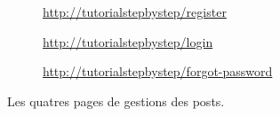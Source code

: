 \begin{figure}[!h]
    \begin{subfigure}[c]{0.73\textwidth}
    \end{subfigure}\hfill
    \begin{subfigure}[c]{0.24\textwidth}
        \caption{\url{http://tutorialstepbystep/register}} 
    \end{subfigure}
    \begin{subfigure}[c]{0.73\textwidth}
    \end{subfigure}\hfill
    \begin{subfigure}[c]{0.24\textwidth}
        \caption{\url{http://tutorialstepbystep/login}} 
    \end{subfigure}
    \begin{subfigure}[c]{0.73\textwidth}
    \end{subfigure}\hfill
    \begin{subfigure}[c]{0.24\textwidth}
        \caption{\url{http://tutorialstepbystep/forgot-password}\label{fig:auth_forgot}} 
    \end{subfigure}
    \caption{Les quatres pages de gestions des posts.}
\end{figure}

